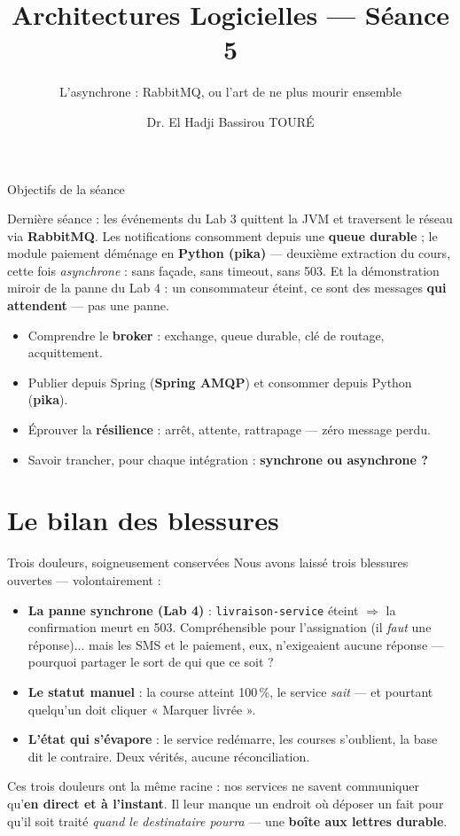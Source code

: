 \documentclass[aspectratio=169,11pt]{beamer}
\title{Architectures Logicielles — Séance 5}
\subtitle{L'asynchrone : RabbitMQ, ou l'art de ne plus mourir ensemble}
\author{Dr. El Hadji Bassirou TOURÉ}
\institute{Département de Mathématiques et Informatique\\ Faculté des Sciences et Techniques\\ Université Cheikh Anta Diop de Dakar}
\date{}
\begin{document}
\begin{frame}\titlepage\end{frame}

\begin{frame}{Objectifs de la séance}
\begin{ucaddef}[Contenu]
{\small Dernière séance : les événements du Lab 3 quittent la JVM et traversent le réseau via \textbf{RabbitMQ}. Les notifications consomment depuis une \textbf{queue durable} ; le module paiement déménage en \textbf{Python (pika)} — deuxième extraction du cours, cette fois \emph{asynchrone} : sans façade, sans timeout, sans 503. Et la démonstration miroir de la panne du Lab 4 : un consommateur éteint, ce sont des messages \textbf{qui attendent} — pas une panne.}
\end{ucaddef}
\begin{itemize}\small
  \item Comprendre le \textbf{broker} : exchange, queue durable, clé de routage, acquittement.
  \item Publier depuis Spring (\textbf{Spring AMQP}) et consommer depuis Python (\textbf{pika}).
  \item Éprouver la \textbf{résilience} : arrêt, attente, rattrapage — zéro message perdu.
  \item Savoir trancher, pour chaque intégration : \textbf{synchrone ou asynchrone ?}
\end{itemize}
\end{frame}

\section{Le bilan des blessures}

\begin{frame}{Trois douleurs, soigneusement conservées}
{\small Nous avons laissé trois blessures ouvertes — volontairement :}
\begin{itemize}\small
  \item \textbf{La panne synchrone (Lab 4)} : \texttt{livraison-service} éteint $\Rightarrow$ la confirmation meurt en 503. Compréhensible pour l'assignation (il \emph{faut} une réponse)... mais les SMS et le paiement, eux, n'exigeaient aucune réponse — pourquoi partager le sort de qui que ce soit ?
  \item \textbf{Le statut manuel} : la course atteint 100\,\%, le service \emph{sait} — et pourtant quelqu'un doit cliquer « Marquer livrée ».
  \item \textbf{L'état qui s'évapore} : le service redémarre, les courses s'oublient, la base dit le contraire. Deux vérités, aucune réconciliation.
\end{itemize}
\begin{ucadret}
{\small Ces trois douleurs ont la même racine : nos services ne savent communiquer qu'\textbf{en direct et à l'instant}. Il leur manque un endroit où déposer un fait pour qu'il soit traité \emph{quand le destinataire pourra} — une \textbf{boîte aux lettres durable}.}
\end{ucadret}
\end{frame}
\end{document}
